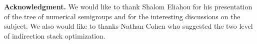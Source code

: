 \documentclass[reqno,11pt]{amsart}
\theoremstyle{plain}
\theoremstyle{definition}
\renewcommand{\leq}{\leqslant}
\newcommand{\MMX}{\texttt{MMX}\xspace}
\renewcommand{\tt}[1]{\texttt{#1}}
\begin{document}
\textbf{Acknowledgment.} We would like to thank Shalom Eliahou for his
presentation of the tree of numerical semigroups and for the interesting
discussions on the subject. We also would like to thanks Nathan Cohen who
suggested the two level of indirection stack optimization.

\end{document}
